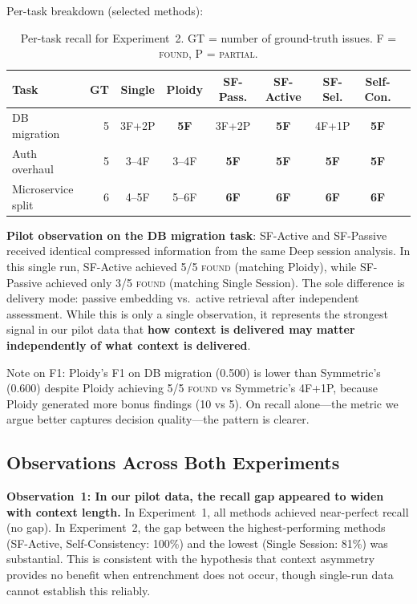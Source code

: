 \documentclass[11pt]{article}
\begin{document}
Per-task breakdown (selected methods):

\begin{table}[t]
\centering
\caption{Per-task recall for Experiment~2. GT = number of ground-truth issues. F = \textsc{found}, P = \textsc{partial}.}
\label{tab:exp2-pertask}
\small
\begin{tabular}{@{}lr ccccccc@{}}
\toprule
\textbf{Task} & \textbf{GT} & \textbf{Single} & \textbf{Ploidy} & \textbf{SF-Pass.} & \textbf{SF-Active} & \textbf{SF-Sel.} & \textbf{Self-Con.} \\
\midrule
DB migration       & 5 & 3F+2P          & \textbf{5F} & 3F+2P          & \textbf{5F} & 4F+1P          & \textbf{5F} \\
Auth overhaul      & 5 & 3--4F          & 3--4F       & \textbf{5F}    & \textbf{5F} & \textbf{5F}    & \textbf{5F} \\
Microservice split & 6 & 4--5F          & 5--6F       & \textbf{6F}    & \textbf{6F} & \textbf{6F}    & \textbf{6F} \\
\bottomrule
\end{tabular}
\end{table}

\textbf{Pilot observation on the DB migration task}: SF-Active and SF-Passive received identical compressed information from the same Deep session analysis. In this single run, SF-Active achieved 5/5 \textsc{found} (matching Ploidy), while SF-Passive achieved only 3/5 \textsc{found} (matching Single Session). The sole difference is delivery mode: passive embedding vs.\ active retrieval after independent assessment. While this is only a single observation, it represents the strongest signal in our pilot data that \textbf{how context is delivered may matter independently of what context is delivered}.

Note on F1: Ploidy's F1 on DB migration (0.500) is lower than Symmetric's (0.600) despite Ploidy achieving 5/5 \textsc{found} vs Symmetric's 4F+1P, because Ploidy generated more bonus findings (10 vs 5). On recall alone---the metric we argue better captures decision quality---the pattern is clearer.

\subsection{Observations Across Both Experiments}
\label{sec:cross-observations}

\textbf{Observation~1: In our pilot data, the recall gap appeared to widen with context length.} In Experiment~1, all methods achieved near-perfect recall (no gap). In Experiment~2, the gap between the highest-performing methods (SF-Active, Self-Consistency: 100\%) and the lowest (Single Session: 81\%) was substantial. This is consistent with the hypothesis that context asymmetry provides no benefit when entrenchment does not occur, though single-run data cannot establish this reliably.
\end{document}
